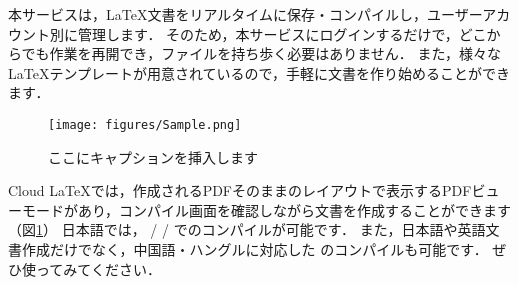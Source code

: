 \documentclass[platex,dvipdfmx]{jsarticle}			%
\begin{document}
本サービスは，\LaTeX 文書をリアルタイムに保存・コンパイルし，ユーザーアカウント別に管理します．
そのため，本サービスにログインするだけで，どこからでも作業を再開でき，ファイルを持ち歩く必要はありません．
また，様々な \LaTeX テンプレートが用意されているので，手軽に文書を作り始めることができます．
\begin{figure}
\centering
\texttt{[image: figures/Sample.png]}
\caption{ここにキャプションを挿入します}
\label{fig:model}
\end{figure}

Cloud LaTeXでは，作成されるPDFそのままのレイアウトで表示するPDFビューモードがあり，コンパイル画面を確認しながら文書を作成することができます（図\ref{fig:model}）
日本語では， \pLaTeX / \upLaTeX / \LuaLaTeX でのコンパイルが可能です．
また，日本語や英語文書作成だけでなく，中国語・ハングルに対応した \XeLaTeX のコンパイルも可能です．
ぜひ使ってみてください．
\end{document}
